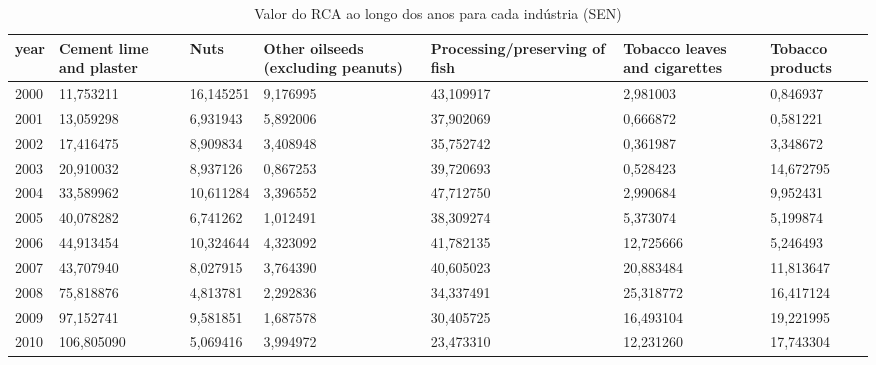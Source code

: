 \begin{table}
\centering
\caption{Valor do RCA ao longo dos anos para cada indústria (SEN)}
\begin{tabular}{p{1cm}p{2cm}p{2cm}p{2cm}p{2cm}p{2cm}p{2cm}}
\toprule
 year &  Cement lime and plaster &      Nuts &  Other oilseeds (excluding peanuts) &  Processing/preserving of fish &  Tobacco leaves and cigarettes &  Tobacco products \\
\midrule
 2000 &                11,753211 & 16,145251 &                            9,176995 &                      43,109917 &                       2,981003 &          0,846937 \\
 2001 &                13,059298 &  6,931943 &                            5,892006 &                      37,902069 &                       0,666872 &          0,581221 \\
 2002 &                17,416475 &  8,909834 &                            3,408948 &                      35,752742 &                       0,361987 &          3,348672 \\
 2003 &                20,910032 &  8,937126 &                            0,867253 &                      39,720693 &                       0,528423 &         14,672795 \\
 2004 &                33,589962 & 10,611284 &                            3,396552 &                      47,712750 &                       2,990684 &          9,952431 \\
 2005 &                40,078282 &  6,741262 &                            1,012491 &                      38,309274 &                       5,373074 &          5,199874 \\
 2006 &                44,913454 & 10,324644 &                            4,323092 &                      41,782135 &                      12,725666 &          5,246493 \\
 2007 &                43,707940 &  8,027915 &                            3,764390 &                      40,605023 &                      20,883484 &         11,813647 \\
 2008 &                75,818876 &  4,813781 &                            2,292836 &                      34,337491 &                      25,318772 &         16,417124 \\
 2009 &                97,152741 &  9,581851 &                            1,687578 &                      30,405725 &                      16,493104 &         19,221995 \\
 2010 &               106,805090 &  5,069416 &                            3,994972 &                      23,473310 &                      12,231260 &         17,743304 \\

\end{tabular}
\end{table}
